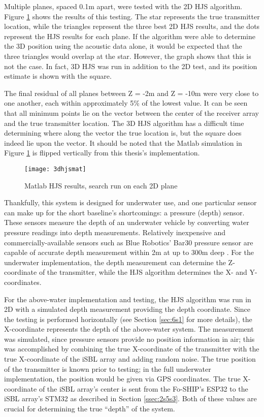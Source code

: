 \documentclass[11pt]{ucthesisCP}
\begin{document}
Multiple planes, spaced 0.1m apart, were tested with the 2D HJS algorithm. Figure \ref{fig:3dhjsmat} shows the results of this testing. The star represents the true transmitter location, while the triangles represent the three best 2D HJS results, and the dots represent the HJS results for each plane. If the algorithm were able to determine the 3D position using the acoustic data alone, it would be expected that the three triangles would overlap at the star. However, the graph shows that this is not the case. In fact, 3D HJS was run in addition to the 2D test, and its position estimate is shown with the square.

The final residual of all planes between Z = -2m and Z = -10m were very close to one another, each within approximately 5\% of the lowest value.  It can be seen that all minimum points lie on the vector between the center of the receiver array and the true transmitter location. The 3D HJS algorithm has a difficult time determining where along the vector the true location is, but the square does indeed lie upon the vector. It should be noted that the Matlab simulation in Figure \ref{fig:3dhjsmat} is flipped vertically from this thesis’s implementation.

\begin{figure}[htbp]
	\centering
	\texttt{[image: 3dhjsmat]}
	\caption{Matlab HJS results, search run on each 2D plane}
	\label{fig:3dhjsmat}
\end{figure}

Thankfully, this system is designed for underwater use, and one particular sensor can make up for the short baseline’s shortcomings: a pressure (depth) sensor. These sensors measure the depth of an underwater vehicle by converting water pressure readings into depth measurements. Relatively inexpensive and commercially-available sensors such as Blue Robotics’ Bar30 pressure sensor are capable of accurate depth measurement within 2m at up to 300m deep \cite{blueps}. For the underwater implementation, the depth measurement can determine the Z-coordinate of the transmitter, while the HJS algorithm determines the X- and Y-coordinates.

For the above-water implementation and testing, the HJS algorithm was run in 2D with a simulated depth measurement providing the depth coordinate. Since the testing is performed horizontally (see Section \ref{sec:6s1} for more details), the X-coordinate represents the depth of the above-water system. The measurement was simulated, since pressure sensors provide no position information in air; this was accomplished by combining the true X-coordinate of the transmitter with the true X-coordinate of the iSBL array and adding random noise. The true position of the transmitter is known prior to testing; in the full underwater implementation, the position would be given via GPS coordinates. The true X-coordinate of the iSBL array’s center is sent from the Fo-SHIP’s ESP32 to the iSBL array’s STM32 as described in Section \ref{ssec:2s5s3}. Both of these values are crucial for determining the true “depth” of the system.
\end{document}
